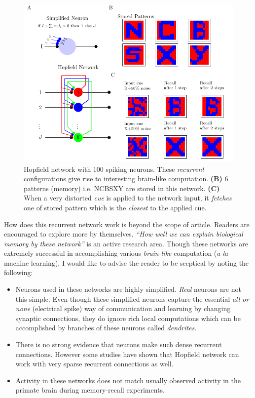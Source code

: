 \documentclass[]{resonance}
\begin{document}
\begin{figure}[!hb]
    \centering
    \caption{Hopfield network with 100 spiking neurons. These \emph{recurrent} 
        configurations give rise to interesting brain-like
        computation. \textbf{(B)} 6 patterns (memory) i.e. NCBSXY are stored in this
        network. \textbf{(C)} When a very distorted \textit{cue} is applied to
        the network input, it \textit{fetches} one of stored pattern which is
        the \emph{closest} to the applied cue.
    }\label{fig:hopfield}
    \includegraphics[width=\linewidth]{./hopfield.pdf}
\end{figure}

How does this recurrent network work is beyond the scope of article. Readers are
encouraged to explore more by themselves. \emph{``How well we can explain biological
memory by these network''} is an active research area.  Though these networks are
extremely successful in accomplishing various \textit{brain-like} computation
(\textit{a la} machine learning), I would like to advise the reader to be sceptical by
noting the following:

\begin{itemize}
    \item  Neurons used in these networks are highly simplified. \textit{Real}
        neurons are not this simple. Even though these simplified neurons
        capture the essential \textit{all-or-none} (electrical spike) way of
        communication and learning by changing synaptic connections, they do
        ignore rich local computations which can be accomplished by branches of
        these neurons called \textit{dendrites}.
    \item  There is no strong evidence that neurons make such dense recurrent
        connections. However some studies have shown that Hopfield network can
        work with very sparse recurrent connections as well. 
    \item Activity in these networks does not match usually observed activity 
        in the primate brain during memory-recall experiments.
\end{itemize}
\end{document}
